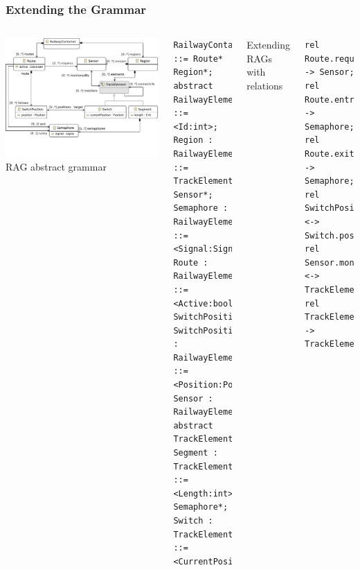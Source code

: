 \documentclass[aspectratio=169,9pt,english]{beamer}
\begin{document}
\begin{frame}[fragile]
	\frametitle{Extending the Grammar}
	\begin{columns}[T]
			\includegraphics[width=\linewidth]{images/ecore-no-enums.pdf}
		RAG abstract grammar
\begin{lstlisting}[language=AST]
RailwayContainer ::= Route* Region*;
abstract RailwayElement ::= <Id:int>;
Region : RailwayElement ::= TrackElement* Sensor*;
Semaphore : RailwayElement ::= <Signal:Signal>;
Route : RailwayElement ::= <Active:boolean> SwitchPosition*;
SwitchPosition : RailwayElement ::= <Position:Position>;
Sensor : RailwayElement;
abstract TrackElement:RailwayElement;
Segment : TrackElement ::= <Length:int> Semaphore*;
Switch : TrackElement ::= <CurrentPosition:Position>;
\end{lstlisting}
	Extending RAGs with relations
\begin{lstlisting}[language=AST]
rel Route.requires* -> Sensor;
rel Route.entry? -> Semaphore;
rel Route.exit? -> Semaphore;
rel SwitchPosition.target <-> Switch.positions*;
rel Sensor.monitors* <-> TrackElement.monitoredBy*;
rel TrackElement.connectsTo* -> TrackElement;
\end{lstlisting}
	\end{columns}
\end{frame}
\end{document}
